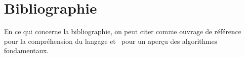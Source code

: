 \section*{Bibliographie}
\label{Bibliographie}
En ce qui concerne la bibliographie, on peut citer comme ouvrage de
r\'ef\'erence~\cite{KernighanRitchie1986} pour la compr\'ehension du
langage et~\cite{Sedgewick2001} pour un aper\c{c}u des algorithmes
fondamentaux.



